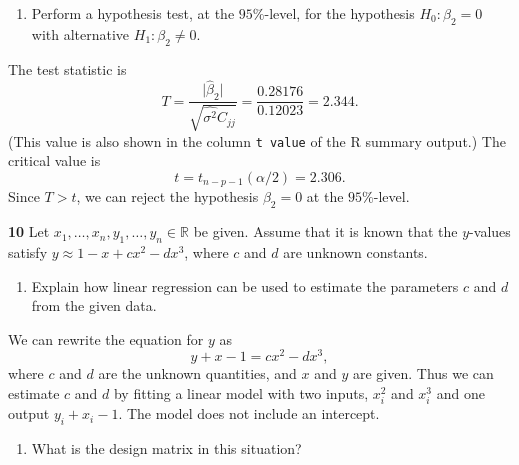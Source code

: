 \documentclass[
  a4paper,
]{article}
\providecommand{\tightlist}{%
  \setlength{\itemsep}{0pt}\setlength{\parskip}{0pt}}
\theoremstyle{definition}
\theoremstyle{definition}
\theoremstyle{definition}
\theoremstyle{definition}
\theoremstyle{remark}
\begin{document}
\begin{enumerate}
\def\labelenumi{\alph{enumi}.}
\setcounter{enumi}{2}
\tightlist
\item
  Perform a hypothesis test, at the \(95\%\)-level, for the
  hypothesis \(H_0\colon \beta_2 = 0\) with alternative \(H_1\colon \beta_2 \neq 0\).
\end{enumerate}

\begin{myanswers}
The test statistic is
\begin{equation*}
  T
  = \frac{\bigl|\hat\beta_2\bigr|}{\sqrt{\widehat{\sigma^2} C_{jj}} }
  = \frac{0.28176}{0.12023}
  = 2.344.
\end{equation*}
(This value is also shown in the column \texttt{t\ value} of the R
summary output.) The critical value is
\begin{equation*}
  t
  = t_{n-p-1}(\alpha/2)
  = 2.306.
\end{equation*}
Since \(T > t\), we can reject the hypothesis \(\beta_2 = 0\) at the
\(95\%\)-level.

\end{myanswers}

\textbf{10} Let \(x_1, \ldots, x_n, y_1, \ldots, y_n \in \mathbb{R}\) be given. Assume
that it is known that the \(y\)-values satisfy
\(y \approx 1 - x + c x^2 - d x^3\), where \(c\) and \(d\) are unknown
constants.

\begin{enumerate}
\def\labelenumi{\alph{enumi}.}
\tightlist
\item
  Explain how linear regression can be used to estimate the
  parameters \(c\) and \(d\) from the given data.
\end{enumerate}

\begin{myanswers}
We can rewrite the equation for \(y\) as
\begin{equation*}
  y + x - 1 = c x^2 - d x^3,
\end{equation*}
where \(c\) and \(d\) are the unknown quantities, and \(x\) and \(y\)
are given. Thus we can estimate \(c\) and \(d\) by fitting
a linear model with two inputs, \(x_i^2\) and \(x_i^3\)
and one output \(y_i + x_i - 1\). The model does not include
an intercept.

\end{myanswers}

\begin{enumerate}
\def\labelenumi{\alph{enumi}.}
\setcounter{enumi}{1}
\tightlist
\item
  What is the design matrix in this situation?
\end{enumerate}
\end{document}
